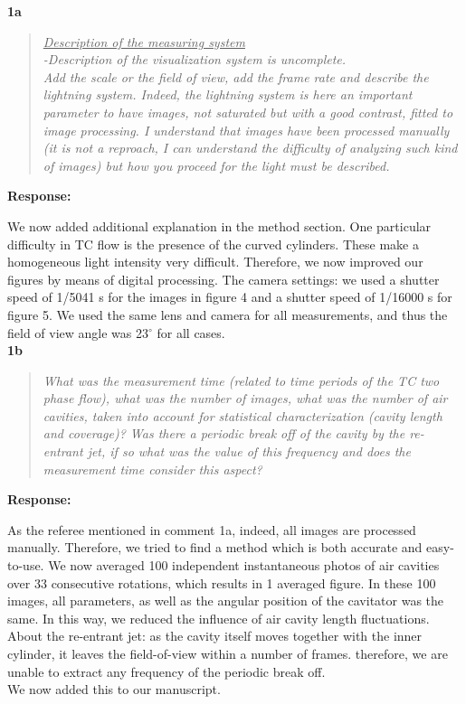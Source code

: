 \documentclass[10pt]{article}
\newcommand{\strong}[1]{\textbf{#1}}
\newcommand{\question}[1]{\begin{quote} \emph{#1}  \end{quote} }
\begin{document}
\noindent \strong{1a}

\question{\underline{Description of the measuring system} \\
-Description of the visualization system is uncomplete. \\
Add the scale or the field of view, add the frame rate and describe the lightning system. Indeed, the lightning system is here an important parameter to have images, not saturated but with a good contrast, fitted to image processing. I understand that images have been processed manually (it is not a reproach, I can understand the difficulty of analyzing such kind of images)  but how you proceed for the light must be described.
 }

\noindent \strong{Response:} 

\noindent We now added additional explanation in the method section. One particular difficulty in TC flow is the presence of the curved cylinders. These make a homogeneous light intensity very difficult. Therefore, we now improved our figures by means of digital processing. The camera settings: we used a shutter speed of 1/5041 s for the images in figure 4 and a shutter speed of 1/16000 s for figure 5. We used the same lens and camera for all measurements, and thus the field of view angle was 23$^{\circ}$ for all cases.\\
	 
\noindent \strong{1b}

\question{What was the measurement time (related to time periods of the TC two phase flow), what was the number of images, what was the number of air cavities, taken into account for statistical characterization (cavity length and coverage)? Was there a periodic break off of the cavity by the re-entrant jet, if so what was the value of this frequency and does the measurement time consider this aspect?
 }

\noindent \strong{Response:} 

\noindent As the referee mentioned in comment 1a, indeed, all images are processed manually. Therefore, we tried to find a method which is both accurate and easy-to-use. We now averaged 100 independent instantaneous photos of air cavities over 33 consecutive rotations, which results in 1 averaged figure. In these 100 images, all parameters, as well as the angular position of the cavitator was the same. In this way, we reduced the influence of air cavity length fluctuations.\\
About the re-entrant jet: as the cavity itself moves together with the inner cylinder, it leaves the field-of-view within a number of frames. therefore, we are unable to extract any frequency of the periodic break off.\\
We now added this to our manuscript. \\
\end{document}
